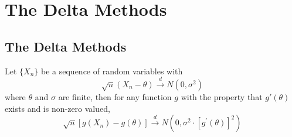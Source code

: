 
\chapter{The Delta Methods}

\section{The Delta Methods}

\begin{theorem}
    Let $\{X_{n}\}$ be a sequence of random variables with
    \begin{equation}
        \sqrt{n}\left(X_{n}-\theta\right)\stackrel{d}{\rightarrow}N\left(0,\sigma^{2}\right)
    \end{equation}
    where $\theta$ and $\sigma$ are finite, then for any function $g$ with the property that $g'(\theta)$ exists and is non-zero valued,
    \begin{equation}
        \sqrt{n}\left[g\left(X_{n}\right)-g(\theta)\right] \stackrel{d}{\rightarrow}N\left(0,\sigma^{2}\cdot\left[g^{\prime}(\theta)\right]^{2}\right)
    \end{equation}
\end{theorem}

